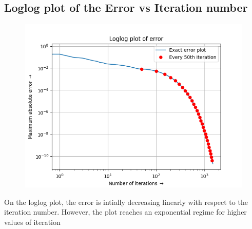 \documentclass[12pt, a4paper]{article}
\begin{document}
\subsection{Loglog plot of the Error vs Iteration number}
\vspace*{-0.5cm}
\begin{figure}[H]
    \centering
    \includegraphics[scale = 0.75]{Figure_3.png}
    \label{fig:sample}
\end{figure}
\vspace*{-0.5cm}
\begin{center}
    On the loglog plot, the error is intially decreasing linearly with respect to the
iteration number. However, the plot reaches an exponential regime for higher
values of iteration
\end{center}
\end{document}
